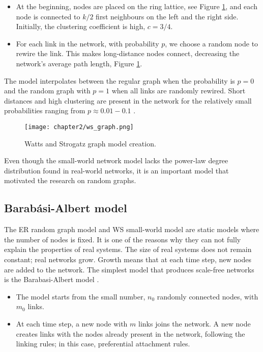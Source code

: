 \begin{itemize}
	\item At the beginning, nodes are placed on the ring lattice, see Figure \ref{fig:wsgraph}, and each node is connected to $k/2$ first neighbours on the left and the right side. Initially, the clustering coefficient is high, $c=3/4$. 
	\item For each link in the network, with probability $p$, we choose a random node to rewire the link. This makes long-distance nodes connect, decreasing the network's average path length, Figure \ref{fig:wsgraph}.
\end{itemize}

The model interpolates between the regular graph when the probability is $p=0$ and the random graph with $p=1$ when all links are randomly rewired. Short distances and high clustering are present in the network  for the relatively small probabilities ranging from $p \approx 0.01 - 0.1$ \cite{watts1998collective}. %

\begin{figure}[H]
	\centering
	\texttt{[image: chapter2/ws\_graph.png]}
	\caption[Watts and Strogatz graph model creation]{Watts and Strogatz graph model creation.}
	\label{fig:wsgraph}
\end{figure}

Even though the small-world network model lacks the power-law degree distribution found in real-world networks, it is an important model that motivated the research on random graphs. 

\subsection{Barab\' {a}si-Albert model}

The ER random graph model and WS small-world model are static models where the number of nodes is fixed. It is one of the reasons why they can not fully explain the properties of real systems. The size of real systems does not remain constant; real networks grow. Growth means that at each time step, new nodes are added to the network. The simplest model that produces scale-free networks is the Barabasi-Albert model \cite{barabasi1999}.

\begin{itemize}
	\item The model starts from the small number, $n_0$ randomly connected nodes, with $m_0$ links.
	\item At each time step, a new node with $m$ links joins the network. A new node creates links with the nodes already present in the network, following the linking rules; in this case, preferential attachment rules. 
\end{itemize}

